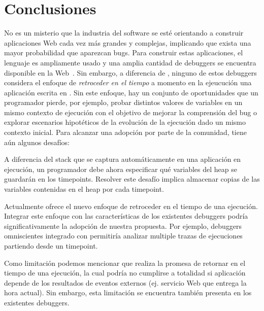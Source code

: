 \documentclass[conference]{IEEEtran}
\begin{document}
\section{Conclusiones}
\label{sec:conc}


No es un misterio que la industria del software se est\'e orientando a construir aplicaciones Web cada vez m\'as grandes y complejas, implicando que exista una mayor probabilidad que aparezcan bugs. Para construir estas aplicaciones, el lenguaje \javascript es ampliamente usado y una amplia cantidad de debuggers se encuentra disponible en la Web~\cite{bartonOdvarko:www2011,jsbin,nodejsInspector,sessionstack,raygun,trackjs,azar:2016,barrAl:fse2016}. Sin embargo, a diferencia de \deloreanjs, ninguno de estos debuggers considera el enfoque de {\em retroceder en el tiempo} a momento en la ejeucuci\'on una aplicaci\'on escrita en \javascript. Sin este enfoque, hay un conjunto de oportunidades que un programador pierde, por ejemplo, probar distintos valores de variables en un mismo contexto de ejecuci\'on con el objetivo de mejorar la comprensi\'on del bug o explorar escenarios hipot\'eticos de la evoluci\'on de la ejecuci\'on dado un mismo contexto inicial. Para alcanzar una adopci\'on por parte de la comunidad, \deloreanjs tiene a\'un algunos desaf\'ios:  
   
\smallskip

 A diferencia del stack que se captura autom\'aticamente en una aplicaci\'on en ejecuci\'on, un programador debe ahora especificar qu\'e variables del heap se guardar\'an en los timepoints. Resolver este desaf\'io implica almacenar copias de las variables contenidas en el heap por cada timepoint.      

\smallskip

 Actualmente \deloreanjs ofrece el nuevo enfoque de retroceder en el tiempo de una ejecuci\'on. Integrar este enfoque con las caracter\'isticas de los existentes debuggers podr\'ia significativamente la adopci\'on de nuestra propuesta. Por ejemplo, debuggers omniscientes integrado con \deloreanjs permitir\'ia analizar multiple trazas de ejecuciones partiendo desde un timepoint.

\smallskip

Como limitaci\'on podemos mencionar que \deloreanjs realiza la promesa de retornar en el tiempo de una ejecuci\'on, la cual podr\'ia no cumplirse a totalidad si aplicaci\'on depende de los resultados de eventos externos (ej. servicio Web que entrega la hora actual). Sin embargo, esta limitaci\'on se encuentra tambi\'en presenta en los existentes debuggers.               



\end{document}
